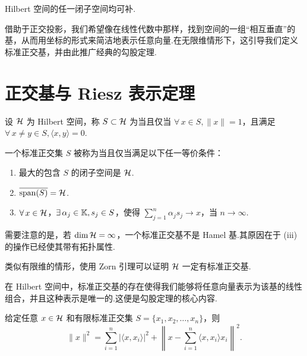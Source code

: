 \begin{corollary}
    Hilbert 空间的任一闭子空间均可补.
\end{corollary}

借助于正交投影，我们希望像在线性代数中那样，找到空间的一组“相互垂直”的基，从而用坐标的形式来简洁地表示任意向量.在无限维情形下，这引导我们定义标准正交基，并由此推广经典的勾股定理.

\section{正交基与 Riesz 表示定理}

\begin{definition}[标准正交集]
    设 $\mathcal{H}$ 为 Hilbert 空间，称 $S \subset \mathcal{H}$ 为当且仅当 $\forall\, x \in S, \|x\| = 1$，且满足$\forall\, x \neq y \in S, \langle x, y \rangle = 0$.
\end{definition}
\begin{definition}[标准正交基]
    一个标准正交集 $S$ 被称为当且仅当满足以下任一等价条件：
    \begin{enumerate}
        \item[(i)] 最大的包含 $S$ 的闭子空间是 $\mathcal{H}$.
        \item[(ii)] $\overline{\operatorname{span}(S)} = \mathcal{H}$.
        \item[(iii)] $\forall\, x \in \mathcal{H}$，$\exists\, \alpha_j \in \mathbb{K}, s_j \in S$，使得 $\sum_{j=1}^n \alpha_j s_j \to x$，当 $n \to \infty$.
    \end{enumerate}
\end{definition}

需要注意的是，若 $\dim \mathcal{H} = \infty$，一个标准正交基不是 Hamel 基.其原因在于 (iii) 的操作已经使其带有拓扑属性.\par
类似有限维的情形，使用 Zorn 引理可以证明 $\mathcal{H}$ 一定有标准正交基.\par
在 Hilbert 空间中，标准正交基的存在使得我们能够将任意向量表示为该基的线性组合，并且这种表示是唯一的.这便是勾股定理的核心内容.

\begin{theorem}[勾股定理]
    给定任意 $x \in \mathcal{H}$ 和有限标准正交集 $S = \{x_1, x_2, \dots, x_n\}$，则
    \[
        \|x\|^2 = \sum_{i=1}^n |\langle x, x_i \rangle|^2 + \left\| x - \sum_{i=1}^n \langle x, x_i \rangle x_i \right\|^2.
    \]
\end{theorem}

